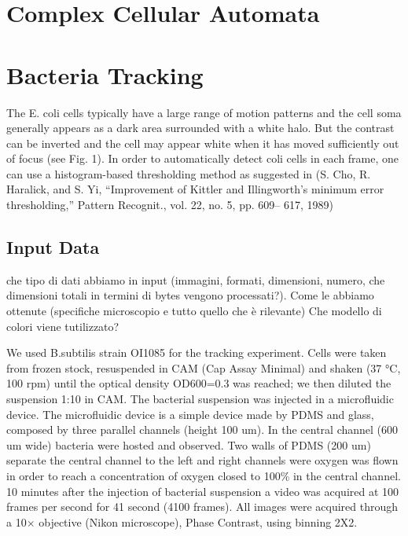\documentclass[conference]{IEEEtran}
\begin{document}
\section{Complex Cellular Automata}




\section{Bacteria Tracking}
The E. coli cells typically have a large range of motion patterns
and the cell soma generally appears as a dark area surrounded
with a white halo. But the contrast can be inverted
and the cell may appear white when it has moved sufficiently
out of focus (see Fig. 1). In order to automatically detect coli
cells in each frame, one can use a histogram-based thresholding
method as suggested in \cite{threshold} (S. Cho, R. Haralick, and S. Yi, “Improvement of Kittler and Illingworth’s minimum error thresholding,” Pattern Recognit., vol. 22, no. 5, pp. 609– 617, 1989)

\subsection{Input Data}
che tipo di dati abbiamo in input (immagini, formati, dimensioni, numero, che dimensioni totali in termini di bytes vengono processati?). Come le abbiamo ottenute (specifiche microscopio e tutto quello che è rilevante)
Che modello di colori viene tutilizzato?

\begin{framed}
We used B.subtilis strain OI1085 for the tracking experiment. Cells were taken from frozen stock, resuspended in CAM (Cap Assay Minimal) and shaken  (37 °C, 100 rpm) until the optical density OD600=0.3 was reached; we then diluted the suspension 1:10 in CAM. The bacterial suspension was injected in a microfluidic device. The microfluidic device is a simple device made by PDMS and glass, composed by three parallel channels (height 100 um). In the central channel (600 um wide) bacteria were hosted and observed. Two  walls of PDMS (200 um) separate the central channel to the left and right channels were oxygen was flown in order to reach a concentration of oxygen closed to 100\% in the central channel. 10 minutes after the injection of bacterial suspension a video was acquired at 100 frames per second for 41 second (4100 frames). All images were acquired through a 10× objective (Nikon microscope), Phase Contrast, using binning 2X2.

\end{framed}
\end{document}
